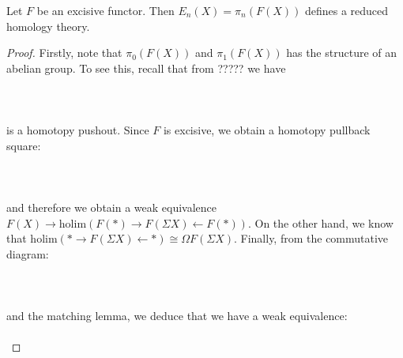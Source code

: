 \documentclass[a4paper]{article}
\begin{document}
\begin{thm}{}{} Let $F$ be an excisive functor. Then $E_n(X)=\pi_n(F(X))$ defines a reduced homology theory. \tcbline
\begin{proof}
Firstly, note that $\pi_0(F(X))$ and $\pi_1(F(X))$ has the structure of an abelian group. To see this, recall that from ????? we have \\~\\
\\~\\
is a homotopy pushout. Since $F$ is excisive, we obtain a homotopy pullback square: \\~\\
\\~\\
and therefore we obtain a weak equivalence $F(X)\to\text{holim}(F(\ast)\rightarrow F(\Sigma X)\leftarrow F(\ast))$. On the other hand, we know that $\text{holim}(\ast\rightarrow F(\Sigma X)\leftarrow\ast)\cong\Omega F(\Sigma X)$. Finally, from the commutative diagram: \\~\\
\\~\\
and the matching lemma, we deduce that we have a weak equivalence: \\~\\
\end{proof}
\end{thm}
\end{document}
